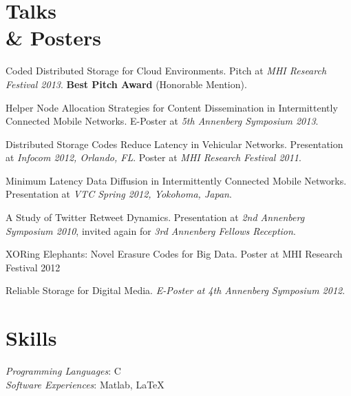 \documentclass[margin,line]{resume}
\begin{document}
\begin{resume}
 \section{\mysidestyle Talks \\ \& Posters} 
  \begin{list2}
  \item Coded Distributed Storage for Cloud Environments. Pitch at \textsl{MHI Research Festival 2013}. \textbf{Best Pitch Award} (Honorable Mention).  
   \item Helper Node Allocation Strategies for Content Dissemination in Intermittently Connected Mobile Networks. E-Poster at \textsl{5th Annenberg Symposium 2013}. 
   \item Distributed Storage Codes Reduce Latency in Vehicular Networks. Presentation at \textsl{Infocom 2012, Orlando, FL}. Poster at \textsl{MHI Research Festival 2011}.
   \item Minimum Latency Data Diffusion in Intermittently Connected Mobile Networks. Presentation at \textsl{VTC Spring 2012, Yokohoma, Japan}.   
   \item A Study of Twitter Retweet Dynamics. Presentation at \textsl{2nd Annenberg Symposium 2010}, invited again for \textsl{3rd Annenberg Fellows Reception}.
   \item XORing Elephants: Novel Erasure Codes for Big Data. Poster at MHI Research Festival 2012
   \item Reliable Storage for Digital Media. \textsl{E-Poster at 4th Annenberg Symposium 2012}. 
   \end{list2}	
   
    \newpage
      
 \section{\mysidestyle Skills} 

    \textsl{Programming Languages}: C\\
    \textsl{Software Experiences}: Matlab, \LaTeX


\end{resume}
\end{document}
